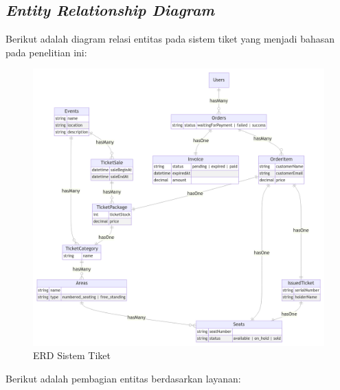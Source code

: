 \subsection{\textit{Entity Relationship Diagram}}

Berikut adalah diagram relasi entitas pada sistem tiket yang menjadi bahasan pada penelitian ini:

\begin{figure}[htbp]
    \centering
    \includegraphics[width=1\textwidth]{resources/appendix/erd.png}
    \caption{ERD Sistem Tiket}
    \label{fig:ticket-system-erd-proposal}
\end{figure}

Berikut adalah pembagian entitas berdasarkan layanan:

